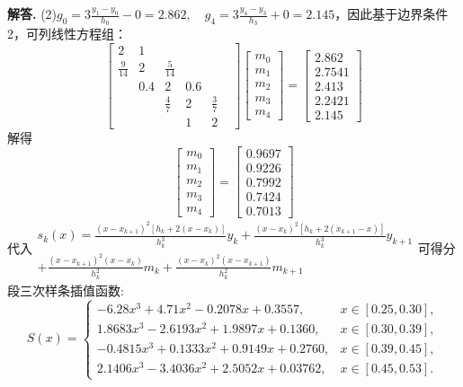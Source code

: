 \documentclass[12pt, a4paper, oneside]{ctexart}
\newenvironment{solution}{\par\noindent\textbf{解答. }}{\par}
\begin{document}
\begin{solution}
(2)$g_0 = 3\frac{y_1 - y_0}{h_0} - 0 = 2.862, \quad g_4 = 3\frac{y_4 - y_3}{h_3} + 0 = 2.145$，因此基于边界条件2，可列线性方程组：
\[\begin{bmatrix}2&1&&&&\\\frac{9}{14}&2&\frac{5}{14}&&&\\ &0.4&2&0.6&&\\ &&\frac{4}{7}&2&\frac{3}{7}&\\ &&&1&2&\end{bmatrix}\begin{bmatrix}m_0\\m_1\\m_2\\m_3\\m_4\end{bmatrix}=\begin{bmatrix}2.862\\2.7541\\2.413\\2.2421\\2.145\end{bmatrix}\]
解得
\[\begin{bmatrix}m_0\\m_1\\m_2\\m_3\\m_4\end{bmatrix}=\begin{bmatrix}0.9697\\0.9226\\0.7992\\0.7424\\0.7013\end{bmatrix}\]
代入$\begin{gathered}s_k(x)=\frac{(x-x_{k+1})^2[h_k+2(x-x_k)]}{h_k^3}y_k+\frac{(x-x_k)^2[h_k+2(x_{k+1}-x)]}{h_k^3}y_{k+1}\\+\frac{(x-x_{k+1})^2(x-x_k)}{h_k^2}m_k+\frac{(x-x_k)^2(x-x_{k+1})}{h_k^2}m_{k+1}\end{gathered}$可得分段三次样条插值函数:
\[S(x)=\begin{cases}-6.28 x^3 + 4.71 x^2 - 0.2078 x + 0.3557, & x\in[0.25,0.30],\\
    1.8683 x^3 - 2.6193 x^2 + 1.9897 x + 0.1360, & x\in[0.30,0.39],\\
    -0.4815 x^3 + 0.1333 x^2 + 0.9149 x + 0.2760, & x\in[0.39,0.45],\\
    2.1406 x^3 - 3.4036 x^2 + 2.5052 x + 0.03762, & x\in[0.45,0.53].
\end{cases}\]
\end{solution}
\end{document}

